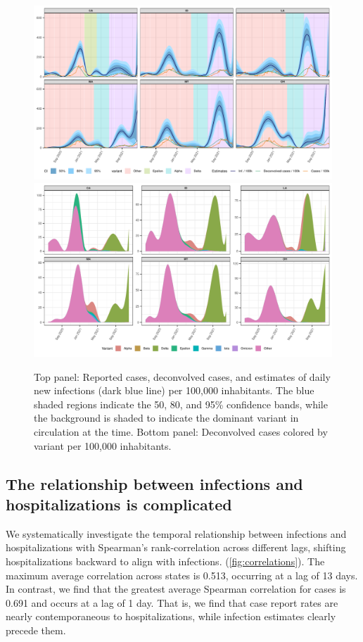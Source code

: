 \documentclass{article}
\begin{document}
\begin{figure}[!tb]
\centering
    \includegraphics[width=\linewidth]{state_niauc_est_6states_F24.pdf}\\
    \includegraphics[width=\linewidth]{state_decon_byvar_est_6states_F24.pdf}
    \caption{Top panel: Reported cases, deconvolved cases, and estimates of daily new infections (dark blue
    line) per 100,000 inhabitants. The blue shaded regions indicate the 50, 80, and 95\% confidence
    bands, while the background is shaded to indicate the dominant variant in
    circulation at the time.
    Bottom panel: Deconvolved cases colored by variant per 100,000 inhabitants.}
    \label{fig:six-states}
\end{figure}

\subsection{The relationship between infections and hospitalizations is complicated}
\label{sec:lagged-correlations}

We systematically investigate the
temporal relationship between infections and hospitalizations with Spearman's
rank-correlation across different lags, shifting hospitalizations backward to
align with infections. (\autoref{fig:correlations}). The maximum average
correlation across states is 0.513, occurring at a lag of 13 days. In contrast,
we find that the greatest average Spearman correlation for cases is 0.691 and
occurs at a lag of 1 day. That is, we find that case report rates are nearly
contemporaneous to hospitalizations, while infection estimates clearly precede
them. 
\end{document}
